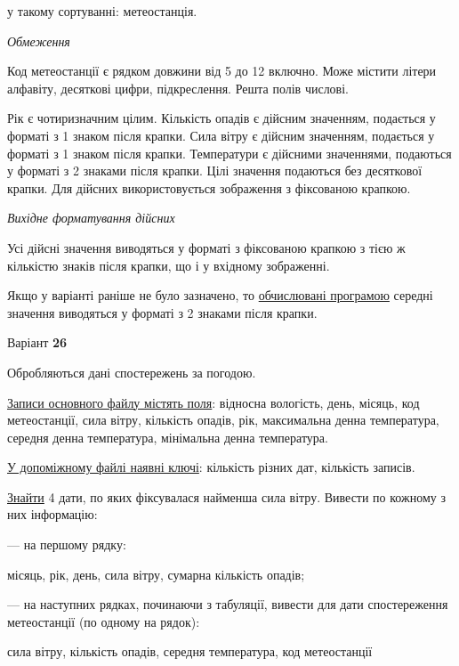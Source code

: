 \documentclass[11pt, ukrainian]{article}
\begin{document}
{\noindent}у такому сортуванні: метеостанція.


\bigskip\textit{Обмеження}

Код метеостанції є рядком довжини від 5 до 12 включно.
Може містити літери алфавіту, десяткові цифри, підкреслення. Решта полів числові.

Рік є чотиризначним цілим.
Кількість опадів є дійсним значенням, подається у форматі з 1 знаком після крапки.
Сила вітру є дійсним значенням, подається у форматі з 1 знаком після крапки.
Температури є дійсними значеннями, подаються у форматі з 2 знаками після крапки.
Цілі значення подаються без десяткової крапки.
Для дійсних використовується зображення з фіксованою крапкою.

\textit{Вихідне форматування дійсних}

Усі дійсні значення виводяться у форматі з фіксованою крапкою з тією ж кількістю знаків після крапки, що і у вхідному зображенні.

Якщо у варіанті раніше не було зазначено, то \underline{обчислювані програмою} середні значення виводяться у форматі з 2 знаками після крапки.


\par
\newpage
{\center Варіант  \No \textbf { 26 }\par}
\bigskip
Обробляються дані спостережень за погодою. 

\underline{Записи основного файлу містять поля}: відносна вологість, день, місяць, код метеостанції, сила вітру, кількість опадів, рік, максимальна денна температура, середня денна температура, мінімальна денна температура.

\underline{У допоміжному файлі наявні ключі}: кількість різних дат, кількість записів.

\underline{Знайти} 4 дати, по яких фіксувалася найменша сила вітру. Вивести по кожному з них інформацію:\par
{\noindent}--- на першому рядку:\par
місяць, рік, день, сила вітру, сумарна кількість опадів;

{\noindent}--- на наступних рядках, починаючи з табуляції, вивести для дати спостереження метеостанції (по одному на рядок):\par
сила вітру, кількість опадів, середня температура, код метеостанції
\end{document}
